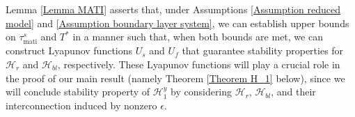 % 
%
%
Lemma \ref{Lemma MATI} asserts that, under Assumptions  \ref{Assumption reduced model} and \ref{Assumption boundary layer system}, we can establish upper bounds on $\tau_{\text{mati}}^s$ and $T^*$ in a manner such that, when both bounds are met, we can construct Lyapunov functions $U_s$ and $U_f$ that guarantee stability properties for $\mathcal{H}_r$ and $\mathcal{H}_{bl}$, respectively. These Lyapunov functions will play a crucial role in the proof of our main result (namely Theorem \ref{Theorem H_1} below), since we will conclude stability property of $\mathcal{H}_1^y$ by considering $\mathcal{H}_r$, $\mathcal{H}_{bl}$, and their interconnection induced by nonzero $\epsilon$. 
%

